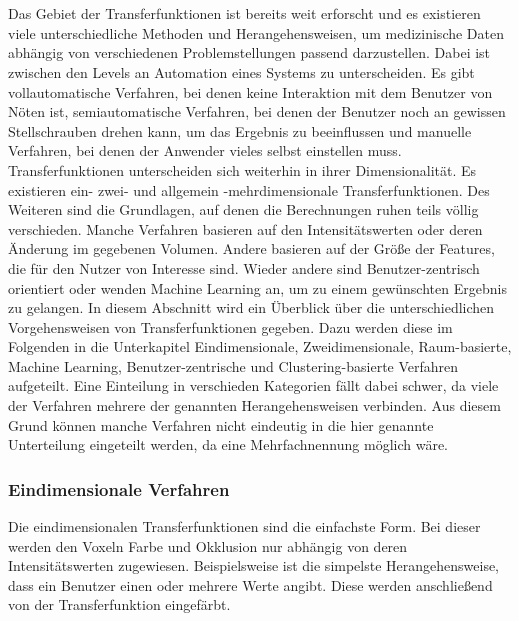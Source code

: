 \chapter{}
\label{sec:state_of_the_art}


Das Gebiet der Transferfunktionen ist bereits weit erforscht und es existieren viele unterschiedliche Methoden und Herangehensweisen, um medizinische Daten abhängig von verschiedenen Problemstellungen passend darzustellen.
\newline
Dabei ist zwischen den Levels an Automation eines Systems zu unterscheiden. Es gibt vollautomatische Verfahren, bei denen keine Interaktion mit dem Benutzer von Nöten ist, semiautomatische Verfahren, bei denen der Benutzer noch an gewissen Stellschrauben drehen kann, um das Ergebnis zu beeinflussen und manuelle Verfahren, bei denen der Anwender vieles selbst einstellen muss.
\newline
Transferfunktionen unterscheiden sich weiterhin in ihrer Dimensionalität. Es existieren ein- zwei- und allgemein -mehrdimensionale Transferfunktionen.
Des Weiteren sind die Grundlagen, auf denen die Berechnungen ruhen teils völlig verschieden. Manche Verfahren basieren auf den Intensitätswerten oder deren Änderung im gegebenen Volumen. Andere basieren auf der Größe der Features, die für den Nutzer von Interesse sind. Wieder andere sind Benutzer-zentrisch orientiert oder wenden Machine Learning an, um zu einem gewünschten Ergebnis zu gelangen.
\newline
In diesem Abschnitt wird ein Überblick über die unterschiedlichen Vorgehensweisen von Transferfunktionen gegeben. Dazu werden diese im Folgenden in die Unterkapitel Eindimensionale, Zweidimensionale, Raum-basierte, Machine Learning, Benutzer-zentrische und Clustering-basierte Verfahren aufgeteilt.
Eine Einteilung in verschieden Kategorien fällt dabei schwer, da viele der Verfahren mehrere der genannten Herangehensweisen verbinden. Aus diesem Grund können manche Verfahren nicht eindeutig in die hier genannte Unterteilung eingeteilt werden, da eine Mehrfachnennung möglich wäre.


\subsection{Eindimensionale Verfahren}

Die eindimensionalen Transferfunktionen sind die einfachste Form. Bei dieser werden den Voxeln Farbe und Okklusion nur abhängig von deren Intensitätswerten zugewiesen. Beispielsweise ist die simpelste Herangehensweise, dass ein Benutzer einen oder mehrere Werte angibt. Diese werden anschließend von der Transferfunktion eingefärbt.

